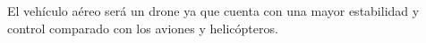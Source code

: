 El vehículo aéreo será un drone ya que cuenta con una mayor estabilidad y control comparado con los aviones y helicópteros.